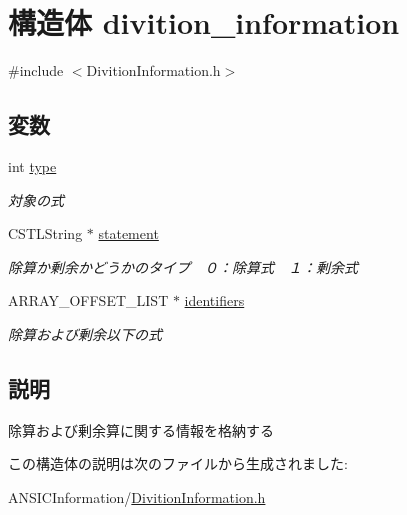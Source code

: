 \section{構造体 divition\_\-information}
\label{structdivition__information}


{\ttfamily \#include $<$DivitionInformation.h$>$}

\subsection*{変数}
\begin{DoxyCompactItemize}
\item 
int \hyperlink{structdivition__information_a47c7af44ae5f360dc369efd35b72129e}{type}\label{structdivition__information_a47c7af44ae5f360dc369efd35b72129e}

\begin{DoxyCompactList}\small\item\em 対象の式 \item\end{DoxyCompactList}\item 
CSTLString $\ast$ \hyperlink{structdivition__information_ad79d014f72312183ee99402b6b2001e9}{statement}\label{structdivition__information_ad79d014f72312183ee99402b6b2001e9}

\begin{DoxyCompactList}\small\item\em 除算か剰余かどうかのタイプ　０：除算式　１：剰余式 \item\end{DoxyCompactList}\item 
ARRAY\_\-OFFSET\_\-LIST $\ast$ \hyperlink{structdivition__information_aef16f1ef4d1f8cb9e2440017dd8c004f}{identifiers}\label{structdivition__information_aef16f1ef4d1f8cb9e2440017dd8c004f}

\begin{DoxyCompactList}\small\item\em 除算および剰余以下の式 \item\end{DoxyCompactList}\end{DoxyCompactItemize}


\subsection{説明}
除算および剰余算に関する情報を格納する 

この構造体の説明は次のファイルから生成されました:\begin{DoxyCompactItemize}
\item 
ANSICInformation/\hyperlink{DivitionInformation_8h}{DivitionInformation.h}\end{DoxyCompactItemize}
